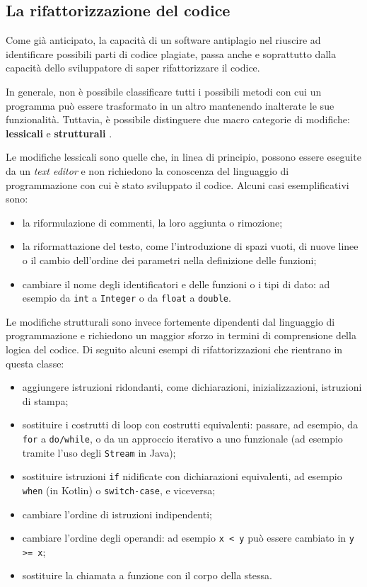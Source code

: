 \subsection{La rifattorizzazione del codice}
Come già anticipato, la capacità di un software antiplagio nel riuscire ad identificare possibili parti di codice plagiate, passa anche e soprattutto dalla capacità dello sviluppatore di saper rifattorizzare il codice.

In generale, non è possibile classificare tutti i possibili metodi con cui un programma può essere trasformato in un altro mantenendo inalterate le sue funzionalità.
%
Tuttavia, è possibile distinguere due macro categorie di modifiche: \textbf{lessicali} e \textbf{strutturali} \cite{joy-99}.

Le modifiche lessicali sono quelle che, in linea di principio, possono essere eseguite da un \textit{text editor} e non richiedono la conoscenza del linguaggio di programmazione con cui è stato sviluppato il codice. 
%
Alcuni casi esemplificativi sono:
\begin{itemize}
    \item la riformulazione di commenti, la loro aggiunta o rimozione;
    \item la riformattazione del testo, come l'introduzione di spazi vuoti, di nuove linee o il cambio dell'ordine dei parametri nella definizione delle funzioni;
    \item cambiare il nome degli identificatori e delle funzioni o i tipi di dato: ad esempio da \texttt{int} a \texttt{Integer} o da \texttt{float} a \texttt{double}.
\end{itemize}

Le modifiche strutturali sono invece fortemente dipendenti dal linguaggio di programmazione e richiedono un maggior sforzo in termini di comprensione della logica del codice.
%
Di seguito alcuni esempi di rifattorizzazioni che rientrano in questa classe:
\begin{itemize}
    \item aggiungere istruzioni ridondanti, come dichiarazioni, inizializzazioni, istruzioni di stampa;
    \item sostituire i costrutti di loop con costrutti equivalenti: passare, ad esempio, da \texttt{for} a \texttt{do/while}, o da un approccio iterativo a uno funzionale (ad esempio tramite l'uso degli \texttt{Stream} in Java);
    \item sostituire istruzioni \texttt{if} nidificate con dichiarazioni equivalenti, ad esempio \texttt{when} (in Kotlin) o \texttt{switch-case}, e viceversa;
    \item cambiare l'ordine di istruzioni indipendenti;
    \item cambiare l'ordine degli operandi: ad esempio \texttt{x < y} può essere cambiato in \texttt{y >= x};
    \item sostituire la chiamata a funzione con il corpo della stessa.
\end{itemize}

